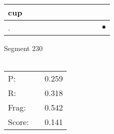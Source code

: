 \documentclass[landscape]{article}
\newcommand{\ssp}{\hspace{2pt}}
\newcommand{\mex}{\cellcolor{g}$\bullet$}
\begin{document}
\begin{tabular}{|l|p{10pt}|p{10pt}|p{10pt}|p{10pt}|p{10pt}|p{10pt}|p{10pt}|p{10pt}|p{10pt}|p{10pt}|}
\hline
\ssp cup \ssp&\hspace{2pt}&\hspace{2pt}&\hspace{2pt}&\hspace{2pt}&\hspace{2pt}&\hspace{2pt}&\hspace{2pt}&\hspace{2pt}&\hspace{2pt}&\hspace{2pt}\\
\hline
\ssp \cellcolor{ref9}. \ssp&\hspace{2pt}&\hspace{2pt}&\hspace{2pt}&\hspace{2pt}&\hspace{2pt}&\hspace{2pt}&\hspace{2pt}&\hspace{2pt}&\hspace{2pt}&\hspace{2pt}\mex\\
\hline
\end{tabular}

\vspace{6pt}
\noindent Segment 230\\\\
\noindent\begin{tabular}{lm{12pt}r}
\hline
P:&&0.259\\
R:&&0.318\\
Frag:&&0.542\\
Score:&&0.141\\
\end{tabular}

\newpage
\end{document}
